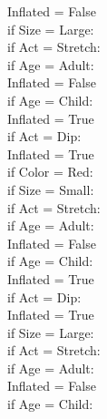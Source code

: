 \begin{enumerate}
\begin{enumerate}
				 \hspace*{10 mm}Inflated = False\\
				 \hspace*{5 mm}if Size = Large:\\
				 \hspace*{15 mm}if Act = Stretch:\\
				 \hspace*{20 mm}if Age = Adult:\\
				 \hspace*{25 mm}Inflated = False\\
				 \hspace*{20 mm}if Age = Child:\\
				 \hspace*{25 mm}Inflated = True\\
				 \hspace*{15 mm}if Act = Dip:\\
				 \hspace*{20 mm}Inflated = True\\
				 if Color = Red:\\
				 \hspace*{5 mm}if Size = Small:\\
				 \hspace*{15 mm}if Act = Stretch:\\
				 \hspace*{20 mm}if Age = Adult:\\
				 \hspace*{25 mm}Inflated = False\\
				 \hspace*{20 mm}if Age = Child:\\
				 \hspace*{25 mm}Inflated = True\\
				 \hspace*{15 mm}if Act = Dip:\\
				 \hspace*{20 mm}Inflated = True\\
				 \hspace*{5 mm}if Size = Large:\\
				 \hspace*{15 mm}if Act = Stretch:\\
				 \hspace*{20 mm}if Age = Adult:\\
				 \hspace*{25 mm}Inflated = False\\
				 \hspace*{20 mm}if Age = Child:\\

\end{enumerate}
\end{enumerate}
